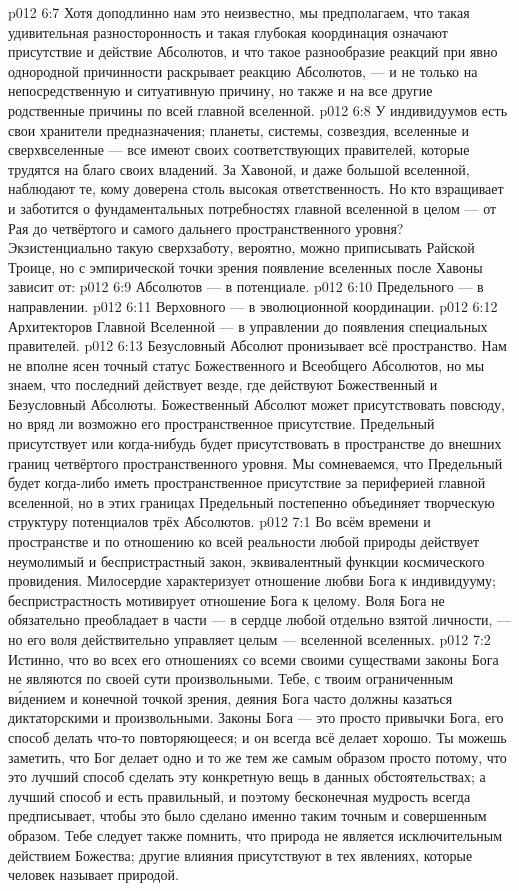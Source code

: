 \vs p012 6:7 Хотя доподлинно нам это неизвестно, мы предполагаем, что такая удивительная разносторонность и такая глубокая координация означают присутствие и действие Абсолютов, и что такое разнообразие реакций при явно однородной причинности раскрывает реакцию Абсолютов, --- и не только на непосредственную и ситуативную причину, но также и на все другие родственные причины по всей главной вселенной.
\vs p012 6:8 \pc У индивидуумов есть свои хранители предназначения; планеты, системы, созвездия, вселенные и сверхвселенные --- все имеют своих соответствующих правителей, которые трудятся на благо своих владений. За Хавоной, и даже большой вселенной, наблюдают те, кому доверена столь высокая ответственность. Но кто взращивает и заботится о фундаментальных потребностях главной вселенной в целом --- от Рая до четвёртого и самого дальнего пространственного уровня? Экзистенциально такую сверхзаботу, вероятно, можно приписывать Райской Троице, но с эмпирической точки зрения появление вселенных после Хавоны зависит от:
\vs p012 6:9 Абсолютов --- в потенциале.
\vs p012 6:10 Предельного --- в направлении.
\vs p012 6:11 Верховного --- в эволюционной координации.
\vs p012 6:12 Архитекторов Главной Вселенной --- в управлении до появления специальных правителей.
\vs p012 6:13 \pc Безусловный Абсолют пронизывает всё пространство. Нам не вполне ясен точный статус Божественного и Всеобщего Абсолютов, но мы знаем, что последний действует везде, где действуют Божественный и Безусловный Абсолюты. Божественный Абсолют может присутствовать повсюду, но вряд ли возможно его пространственное присутствие. Предельный присутствует или когда\hyp{}нибудь будет присутствовать в пространстве до внешних границ четвёртого пространственного уровня. Мы сомневаемся, что Предельный будет когда\hyp{}либо иметь пространственное присутствие за периферией главной вселенной, но в этих границах Предельный постепенно объединяет творческую структуру потенциалов трёх Абсолютов.
\vs p012 7:1 Во всём времени и пространстве и по отношению ко всей реальности любой природы действует неумолимый и беспристрастный закон, эквивалентный функции космического провидения. Милосердие характеризует отношение любви Бога к индивидууму; беспристрастность мотивирует отношение Бога к целому. Воля Бога не обязательно преобладает в части --- в сердце любой отдельно взятой личности, --- но его воля действительно управляет целым --- вселенной вселенных.
\vs p012 7:2 \pc Истинно, что во всех его отношениях со всеми своими существами законы Бога не являются по своей сути произвольными. Тебе, с твоим ограниченным в\'идением и конечной точкой зрения, деяния Бога часто должны казаться диктаторскими и произвольными. Законы Бога --- это просто привычки Бога, его способ делать что\hyp{}то повторяющееся; и он всегда всё делает хорошо. Ты можешь заметить, что Бог делает одно и то же тем же самым образом просто потому, что это лучший способ сделать эту конкретную вещь в данных обстоятельствах; а лучший способ и есть правильный, и поэтому бесконечная мудрость всегда предписывает, чтобы это было сделано именно таким точным и совершенным образом. Тебе следует также помнить, что природа не является исключительным действием Божества; другие влияния присутствуют в тех явлениях, которые человек называет природой.
